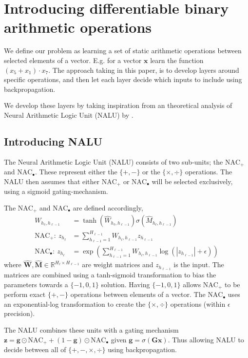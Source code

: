 \section{Introducing differentiable binary arithmetic operations}
\label{sec:Nalu}
We define our problem as learning a set of static arithmetic operations between selected elements of a vector. E.g. for a vector $\mathbf{x}$ learn the function ${(x_5 + x_1) \cdot x_7}$. The approach taking in this paper, is to develop layers around specific operations, and then let each layer decide which inputs to include using backpropagation.

We develop these layers by taking inspiration from an theoretical analysis of Neural Arithmetic Logic Unit (NALU) by \citet{trask-nalu}.

\subsection{Introducing NALU}
The Neural Arithmetic Logic Unit (NALU) consists of two sub-units; the $\text{NAC}_{+}$ and $\text{NAC}_{\bullet}$. These represent either the $\{+, -\}$ or the $\{\times, \div \}$ operations. The NALU then assumes that either $\text{NAC}_{+}$ or $\text{NAC}_{\bullet}$ will be selected exclusively, using a sigmoid gating-mechanism.

The $\text{NAC}_{+}$ and $\text{NAC}_{\bullet}$ are defined accordingly,
\begin{align}
W_{h_\ell, h_{\ell-1}} &= \tanh(\hat{W}_{h_\ell, h_{\ell-1}}) \sigma(\hat{M}_{h_\ell, h_{\ell-1}}) \label{eq:weight}\\
\textrm{NAC}_+:\ z_{h_\ell} &= \sum_{h_{\ell-1}=1}^{H_{\ell-1}} W_{h_{\ell}, h_{\ell-1}} z_{h_{\ell-1}} \label{eq:naca}\\
\textrm{NAC}_\bullet:\ z_{h_\ell} &= \exp\left(\sum_{h_{\ell-1}=1}^{H_{\ell-1}} W_{h_{\ell}, h_{\ell-1}} \label{eq:nacm}\log(|z_{h_{\ell-1}}| + \epsilon) \right)
\end{align}
where $\hat{\mathbf{W}}, \hat{\mathbf{M}} \in \mathbb{R}^{H_{\ell} \times H_{\ell-1}}$ are weight matrices and $z_{h_{\ell-1}}$ is the input. The matrices are combined using a tanh-sigmoid transformation to bias the parameters towards a $\{-1,0,1\}$ solution. Having $\{-1,0,1\}$ allows $\text{NAC}_{+}$ to be perform exact $\{+, -\}$ operations between elements of a vector.
The $\text{NAC}_{\bullet}$ uses an exponential-log transformation to create the $\{\times, \div \}$ operations (within $\epsilon$ precision).

The NALU combines these units with a gating mechanism $\mathbf{z} = \mathbf{g} \odot \text{NAC}_{+} + (1 - \mathbf{g}) \odot \text{NAC}_{\bullet}$ given $\mathbf{g} = \sigma(\mathbf{G} \mathbf{x})$. Thus allowing NALU to decide between all of $\{+, -, \times, \div\}$ using backpropagation.


